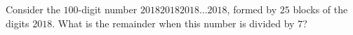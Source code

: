 Consider the $100$-digit number $201820182018\ldots2018$, formed by $25$ blocks of the digits $2018$. What is the remainder when this number is divided by $7$?
